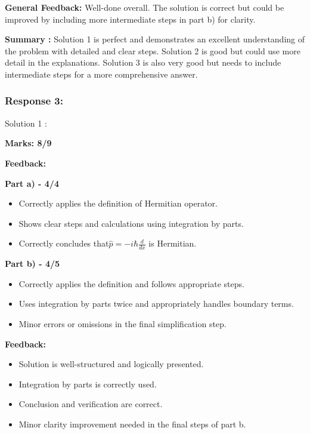 \documentclass[a4paper,11pt]{article}
\begin{document}
\textbf{General Feedback:}
Well-done overall. The solution is correct but could be improved by including more intermediate steps in part b) for clarity.

\textbf{Summary :}
Solution 1 is perfect and demonstrates an excellent understanding of the problem with detailed and clear steps. Solution 2 is good but could use more detail in the explanations. Solution 3 is also very good but needs to include intermediate steps for a more comprehensive answer.



\subsubsection*{Response 3:}

Solution 1 :

\textbf{Marks: 8/9}

\textbf{Feedback:}

\textbf{Part a) - 4/4}

\begin{itemize}
    \item Correctly applies the definition of Hermitian operator.
    \item Shows clear steps and calculations using integration by parts.
    \item Correctly concludes that$\hat{p} = -i \hbar \frac{d}{dx}$ is Hermitian.
\end{itemize}

\textbf{Part b) - 4/5}

\begin{itemize}
    \item Correctly applies the definition and follows appropriate steps.
    \item Uses integration by parts twice and appropriately handles boundary terms.
    \item Minor errors or omissions in the final simplification step.
\end{itemize}

\textbf{Feedback:}

\begin{itemize}
    \item Solution is well-structured and logically presented.
    \item Integration by parts is correctly used.
    \item Conclusion and verification are correct.
    \item Minor clarity improvement needed in the final steps of part b.
\end{itemize}
\end{document}
